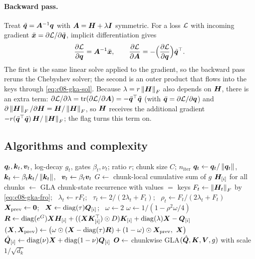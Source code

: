 \paragraph{Backward pass.} Treat $\tilde{\bm{q}}=\bm{A}^{-1}\bm{q}$ with $\bm{A}=\bm{H}+\lambda\bm{I}$ symmetric. For a
loss $\mathcal{L}$ with incoming gradient $\bar{\bm{x}}=\partial\mathcal{L}/\partial\tilde{\bm{q}}$, implicit
differentiation gives
\begin{equation}\label{eq:c08-gka-bwd}
  \frac{\partial\mathcal{L}}{\partial\bm{q}}=\bm{A}^{-1}\bar{\bm{x}},\qquad
  \frac{\partial\mathcal{L}}{\partial\bm{A}}=-\Bigl(\frac{\partial\mathcal{L}}{\partial\bm{q}}\Bigr)\tilde{\bm{q}}^{\top} .
\end{equation}
The first is the same linear solve applied to the gradient, so the backward pass reruns the
Chebyshev solver; the second is an outer product that flows into the keys through
\eqref{eq:c08-gka-sol}. Because $\lambda=r\left\lVert \bm{H}\right\rVert_F$ also depends on $\bm{H}$, there is an extra
term: $\partial\mathcal{L}/\partial\lambda=\operatorname{tr}(\partial\mathcal{L}/\partial\bm{A})=-\bar{\bm{q}}^{\top}\tilde{\bm{q}}$ (with
$\bar{\bm{q}}=\partial\mathcal{L}/\partial\bm{q}$) and $\partial\left\lVert \bm{H}\right\rVert_F/\partial\bm{H}=\bm{H}/\left\lVert \bm{H}\right\rVert_F$, so
$\bm{H}$ receives the additional gradient $-r(\bar{\bm{q}}^{\top}\tilde{\bm{q}})\,\bm{H}/\left\lVert \bm{H}\right\rVert_F$; the flag
 turns this term on.

\subsection{Algorithms and complexity}

\begin{algorithm}[t]
\caption{GKA prefill / training for one head (chunkwise)}\label{alg:c08-gka-prefill}
\begin{algorithmic}[1]
\Require $\bm{q}_t,\bm{k}_t,\bm{v}_t$, log-decay $g_t$, gates $\beta_t,\nu_t$; ratio $r$; chunk size $C$; $n_\text{iter}$
\State $\bm{q}_t\gets\bm{q}_t/\left\lVert \bm{q}_t\right\rVert$, \ $\bm{k}_t\gets\beta_t\bm{k}_t/\left\lVert \bm{k}_t\right\rVert$, \ $\bm{v}_t\gets\beta_t\bm{v}_t$
\State $G\gets$ chunk-local cumulative sum of $g$
\State $\bm{H}_{[i]}$ for all chunks $\gets$ GLA chunk-state recurrence with values $=$ keys
  \State $F_t\gets\left\lVert \bm{H}_t\right\rVert_F$ by \eqref{eq:c08-gka-fro}; \ $\lambda_t\gets rF_t$; \ $\tau_t\gets2/(2\lambda_t+F_t)$; \ $\rho_t\gets F_t/(2\lambda_t+F_t)$
  \State $\bm{X}_\text{prev}\gets\bm{0}$; \ $\bm{X}\gets\operatorname{diag}(\tau)\bm{Q}_{[i]}$; \ $\omega\gets2$
    \State $\omega\gets1/(1-\rho^2\omega/4)$ 
    \State $\bm{R}\gets\operatorname{diag}(e^{G})\bm{X}\bm{H}_{[i]}+((\bm{X}\bm{K}_{[i]}^{\top})\odot D)\bm{K}_{[i]}+\operatorname{diag}(\lambda)\bm{X}-\bm{Q}_{[i]}$
    \State $(\mX,\mX_\text{prev})\gets\bigl(\omega\had(\mX-\diag(\tau)\bm{R})+(1-\omega)\had\mX_\text{prev},\ \mX\bigr)$
  \EndFor
  \State $\hat{\bm{Q}}_{[i]}\gets\operatorname{diag}(\nu)\bm{X}+\operatorname{diag}(1-\nu)\bm{Q}_{[i]}$
\EndFor
\State $\bm{O}\gets$ chunkwise GLA$(\hat{\bm{Q}},\bm{K},\bm{V},g)$ with scale $1/\sqrt{d_k}$ 
\end{algorithmic}
\end{algorithm}

